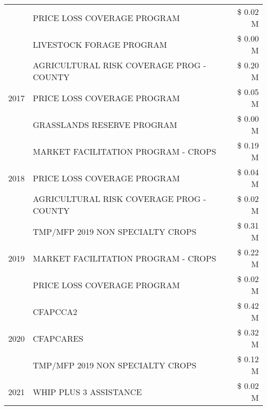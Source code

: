 \begin{tabular}{llr}
 & PRICE LOSS COVERAGE PROGRAM & \$ 0.02 M \\
 & LIVESTOCK FORAGE PROGRAM & \$ 0.00 M \\
\cline{1-3}
\multirow[t]{3}{*}{2017} & AGRICULTURAL RISK COVERAGE PROG - COUNTY & \$ 0.20 M \\
 & PRICE LOSS COVERAGE PROGRAM & \$ 0.05 M \\
 & GRASSLANDS RESERVE PROGRAM & \$ 0.00 M \\
\cline{1-3}
\multirow[t]{3}{*}{2018} & MARKET FACILITATION PROGRAM - CROPS & \$ 0.19 M \\
 & PRICE LOSS COVERAGE PROGRAM & \$ 0.04 M \\
 & AGRICULTURAL RISK COVERAGE PROG - COUNTY & \$ 0.02 M \\
\cline{1-3}
\multirow[t]{3}{*}{2019} & TMP/MFP 2019 NON SPECIALTY CROPS & \$ 0.31 M \\
 & MARKET FACILITATION PROGRAM - CROPS & \$ 0.22 M \\
 & PRICE LOSS COVERAGE PROGRAM & \$ 0.02 M \\
\cline{1-3}
\multirow[t]{3}{*}{2020} & CFAPCCA2 & \$ 0.42 M \\
 & CFAPCARES & \$ 0.32 M \\
 & TMP/MFP 2019 NON SPECIALTY CROPS & \$ 0.12 M \\
\cline{1-3}
2021 & WHIP PLUS 3 ASSISTANCE & \$ 0.02 M \\
\cline{1-3}
\bottomrule
\end{tabular}
